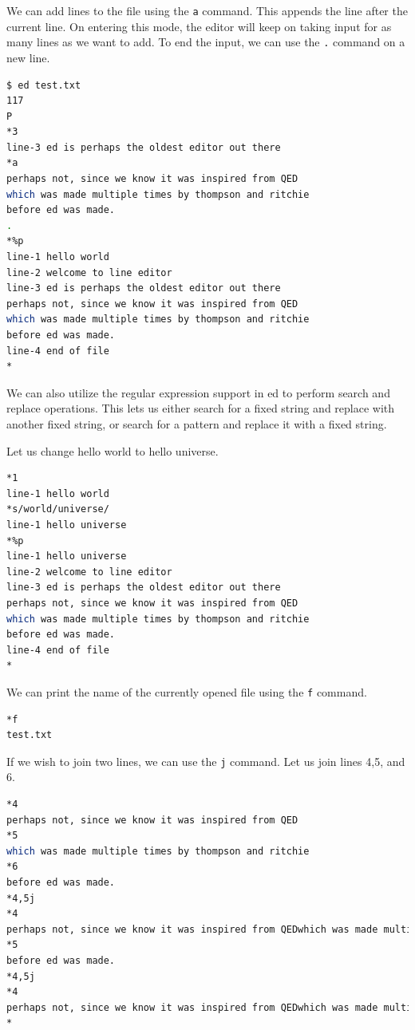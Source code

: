 We can add lines to the file using the \texttt{a} command.
This appends the line after the current line.
On entering this mode, the editor will keep on taking
input for as many lines as we want to add.
To end the input, we can use the \texttt{.} command on a new line.

\begin{lstlisting}[language=bash]
$ ed test.txt
117
P
*3
line-3 ed is perhaps the oldest editor out there
*a
perhaps not, since we know it was inspired from QED
which was made multiple times by thompson and ritchie
before ed was made.
.
*%p
line-1 hello world
line-2 welcome to line editor
line-3 ed is perhaps the oldest editor out there
perhaps not, since we know it was inspired from QED
which was made multiple times by thompson and ritchie
before ed was made.
line-4 end of file
*
\end{lstlisting}

We can also utilize the regular expression support
in ed to perform search and replace operations.
This lets us either search for a fixed string
and replace with another fixed string, or search
for a pattern and replace it with a fixed string.

Let us change hello world to hello universe.

\begin{lstlisting}[language=bash]
*1
line-1 hello world
*s/world/universe/
line-1 hello universe
*%p
line-1 hello universe
line-2 welcome to line editor
line-3 ed is perhaps the oldest editor out there
perhaps not, since we know it was inspired from QED
which was made multiple times by thompson and ritchie
before ed was made.
line-4 end of file
*
\end{lstlisting}

We can print the name of the currently opened file
using the \texttt{f} command.

\begin{lstlisting}[language=bash]
*f
test.txt
\end{lstlisting}

If we wish to join two lines, we can use the \texttt{j} command.
Let us join lines 4,5, and 6.

\begin{lstlisting}[language=bash]
*4
perhaps not, since we know it was inspired from QED
*5
which was made multiple times by thompson and ritchie
*6
before ed was made.
*4,5j
*4
perhaps not, since we know it was inspired from QEDwhich was made multiple times by thompson and ritchie
*5
before ed was made.
*4,5j
*4
perhaps not, since we know it was inspired from QEDwhich was made multiple times by thompson and ritchiebefore ed was made.
*
\end{lstlisting}

